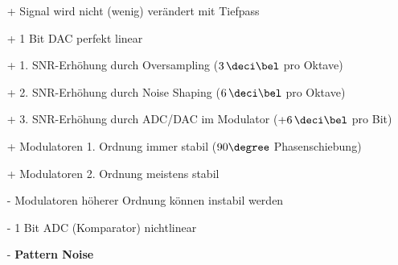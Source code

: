 \begin{minipage}[t]{0.48\columnwidth}
    \begin{itemize}
        \item[+] Signal wird nicht (wenig) verändert mit Tiefpass
        \item[+] 1 Bit DAC perfekt linear 
        \item[+] 1. SNR-Erhöhung durch Oversampling ($3 \, \deci \bel$ pro Oktave)
        \item[+] 2. SNR-Erhöhung durch Noise Shaping ($6 \, \deci \bel$ pro Oktave)
        \item[+] 3. SNR-Erhöhung durch ADC/DAC im Modulator ($+6 \, \deci \bel$ pro Bit)
    \end{itemize}
\end{minipage}
\hfill
\begin{minipage}[t]{0.48\columnwidth}
    \begin{itemize}

        \item[+] Modulatoren 1. Ordnung immer stabil ($90 \degree$ Phasenschiebung)
        \item[+] Modulatoren 2. Ordnung meistens stabil
        \item[-] Modulatoren höherer Ordnung können instabil werden  
        \item[-] 1 Bit ADC (Komparator) nichtlinear
        \item[-] \textbf{Pattern Noise} 
    \end{itemize}
\end{minipage}


